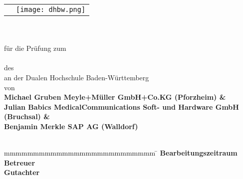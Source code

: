 \begin{titlepage}
	\begin{longtable}{p{} p{}}
	  {} & 
	  {\texttt{[image: dhbw.png]}}
	\end{longtable}
	\enlargethispage{20mm}
	\begin{center}
	  \vspace*{12mm}	{\LARGE\bf \titel }\\
	  \vspace*{12mm}	{\large\bf \arbeit}\\
	  \vspace*{12mm}	für die Prüfung zum\\
	  \vspace*{3mm} 	{\bf \abschluss}\\
	  \vspace*{12mm}	des \studiengang\\
	  \vspace*{3mm} 	an der Dualen Hochschule Baden-Württemberg \dhbw\\
	  \vspace*{12mm}	von\\
	  \vspace*{3mm} 	{\large\bf Michael Gruben \normalsize\rm Meyle+Müller
	  GmbH+Co.KG (Pforzheim) \phantom{iiiiibH (Bruchsal)     }\&}\\
	  \vspace*{3mm} 	{\large\bf Julian Babics \normalsize\rm MedicalCommunications
	  Soft- und Hardware GmbH (Bruchsal) \&}\\
	  \vspace*{3mm} 	{\large\bf Benjamin Merkle \normalsize\rm SAP AG (Walldorf)
	  \phantom{mniiiiiiiiiiiiiiiiiiiiiiiiiiiiiiiiiiiiibH (Bruchsal)}}\\
	  \vspace*{12mm}	\datumAbgabe\\
	\end{center}
	\vfill
	\begin{spacing}{1.2}
	\begin{tabbing}
		mmmmmmmmmmmmmmmmmmmmmmmmmm     \= \kill
		\textbf{Bearbeitungszeitraum}  \>  \zeitraum\\
		\textbf{Betreuer}              \>  \betreuer\\
 		\textbf{Gutachter}             \>  \gutachter
	\end{tabbing}
	\end{spacing}
\end{titlepage}